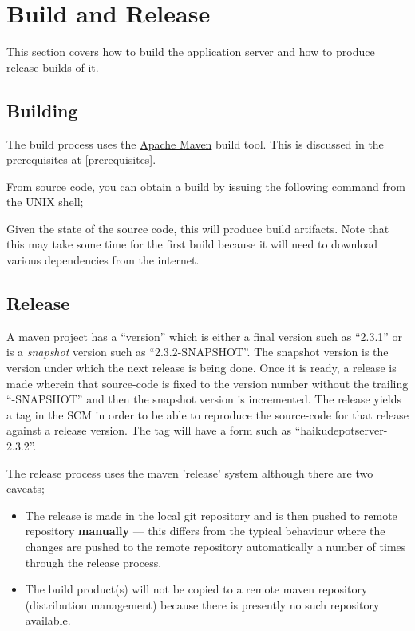 \section{Build and Release}
\label{buildandrelease}

This section covers how to build the application server and how to produce release builds of it.

\subsection{Building}

The build process uses the \href{http://maven.apache.org}{Apache Maven} build tool.  This is discussed in the prerequisites at \ref{prerequisites}.

From source code, you can obtain a build by issuing the following command from the UNIX shell;


Given the state of the source code, this will produce build artifacts.  Note that this may take some time for the first build because it will need to download various dependencies from the internet.

\subsection{Release}

A maven project has a ``version'' which is either a final version such as ``2.3.1'' or is a {\it snapshot} version such as ``2.3.2-SNAPSHOT''.  The snapshot version is the version under which the next release is being done.  Once it is ready, a release is made wherein that source-code is fixed to the version number without the trailing ``-SNAPSHOT'' and then the snapshot version is incremented.  The release yields a tag in the SCM in order to be able to reproduce the source-code for that release against a release version.  The tag will have a form such as ``haikudepotserver-2.3.2''.

 The release process uses the maven 'release' system although there are two caveats;

 \begin{itemize}
 \item The release is made in the local git repository and is then pushed to remote repository {\bf manually} --- this differs from the typical behaviour where the changes are pushed to the remote repository automatically a number of times through the release process.
 \item The build product(s) will not be copied to a remote maven repository (distribution management) because there is presently no such repository available.
 \end{itemize}

